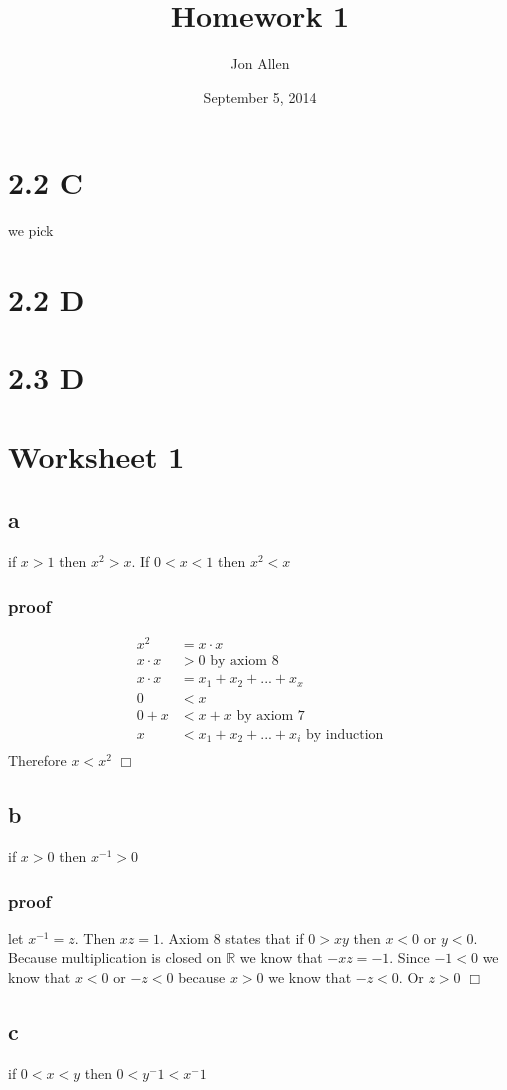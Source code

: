 \documentclass[letterpaper]{article}
\begin{document}
\title{Homework 1}
\date{September 5, 2014}
\author{Jon Allen}
\maketitle
\section*{2.2 C}
we pick 
\section*{2.2 D}
\section*{2.3 D}
\section*{Worksheet 1}
\subsection*{a}
if $x>1$ then $x^2>x$. If $0<x<1$ then $x^2<x$

\subsubsection*{proof}
\begin{align*}
  x^2&=x\cdot x\\
  x\cdot x&>0\text{ by axiom 8}\\
  x\cdot x&=x_1+x_2+...+x_x\\
  0&<x\\
  0+x&<x+x \text{ by axiom 7}\\
  x&<x_1+x_2+...+x_i \text{ by induction}\\
\end{align*}
Therefore $x<x^2$
$\Box$
\subsection*{b}
if $x>0$ then $x^{-1}>0$
\subsubsection*{proof}
let $x^{-1}=z$. Then $xz=1$. Axiom 8 states that if $0>xy$ then $x<0$ or $y<0$. Because multiplication is closed on $\mathbb{R}$ we know that $-xz=-1$. Since $-1<0$ we know that $x<0$ or $-z<0$ because $x>0$ we know that $-z<0$. Or $z>0$ $\Box$
\subsection*{c}
if $0<x<y$ then $0<y^-1<x^-1$
\end{document}
